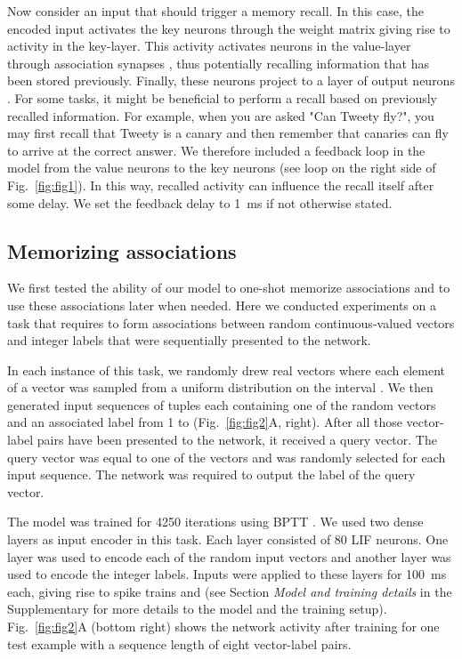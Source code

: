 \documentclass{article}
\begin{document}
Now consider an input  that should trigger a memory recall. In this case, the encoded input  activates the key neurons through the weight matrix  giving rise to activity in the key-layer. This activity activates neurons in the value-layer through association synapses , thus potentially recalling information that has been stored previously. Finally, these neurons project to a layer of output neurons . For some tasks, it might be beneficial to perform a recall based on previously recalled information. For example, when you are asked "Can Tweety fly?", you may first recall that Tweety is a canary and then remember that canaries can fly to arrive at the correct answer. We therefore included a feedback loop in the model from the value neurons to the key neurons (see loop on the right side of Fig.~\ref{fig:fig1}). In this way, recalled activity can influence the recall itself after some delay. We set the feedback delay  to \SI{1}{ms} if not otherwise stated.

\subsection{Memorizing associations}
\label{sec:results-random_associations}
We first tested the ability of our model to one-shot memorize associations and to use these associations later when needed. Here we conducted experiments on a task that requires to form associations between random continuous-valued vectors and integer labels that were sequentially presented to the network.

In each instance of this task, we randomly drew  real vectors where each element of a vector was sampled from a uniform distribution on the interval . We then generated input sequences of  tuples each containing one of the random vectors and an associated label from \num{1} to  (Fig.~\ref{fig:fig2}A, right). After all those vector-label pairs have been presented to the network, it received a query vector. The query vector was equal to one of the  vectors and was randomly selected for each input sequence. The network was required to output the label of the query vector.

The model was trained for \num{4250} iterations using \gls{BPTT} \cite{werbos1990backpropagation,bellec2018long}. We used two dense layers as input encoder in this task. Each layer consisted of \num{80} \gls{LIF} neurons. One layer was used to encode each of the random input vectors and another layer was used to encode the integer labels. Inputs were applied to these layers for \SI{100}{\ms} each, giving rise to spike trains  and  (see Section \emph{Model and training details} in the Supplementary for more details to the model and the training setup). Fig.~\ref{fig:fig2}A (bottom right) shows the network activity after training for one test example with a sequence length  of eight vector-label pairs.
\end{document}
